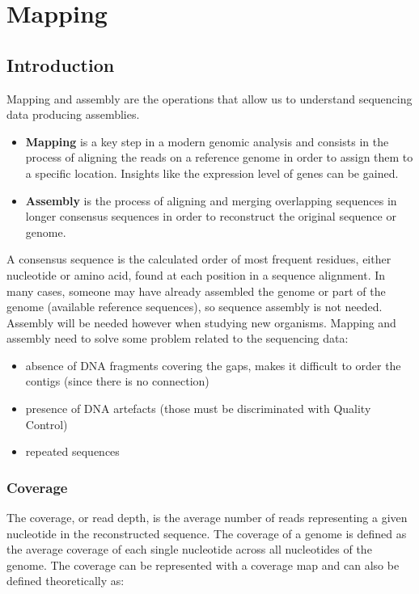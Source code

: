 \graphicspath{{chapters/images/05/}}
\chapter{Mapping}

\section{Introduction}
Mapping and assembly are the operations that allow us to understand sequencing data producing assemblies.

\begin{multicols}{2}
    \begin{itemize}
        \item \textbf{Mapping} is a key step in a modern genomic analysis and consists in the process of aligning the reads on a reference genome in order to assign them to a specific location.
            Insights like the expression level of genes can be gained.
        \item \textbf{Assembly} is the process of aligning and merging overlapping sequences in longer consensus sequences in order to reconstruct the original sequence or genome.
    \end{itemize}
\end{multicols}

A consensus sequence is the calculated order of most frequent residues, either nucleotide or amino acid, found at each position in a sequence alignment.
In many cases, someone may have already assembled the genome or part of the genome (available reference sequences), so sequence assembly is not needed.
Assembly will be needed however when studying new organisms.
Mapping and assembly need to solve some problem related to the sequencing data:

\begin{multicols}{2}
    \begin{itemize}
        \item absence of DNA fragments covering the gaps, makes it difficult to order the contigs (since there is no connection)
        \item presence of DNA artefacts (those must be discriminated with Quality Control)
        \item repeated sequences
    \end{itemize}
\end{multicols}

    \subsection{Coverage}
    The coverage, or read depth, is the average number of reads representing a given nucleotide in the reconstructed sequence.
    The coverage of a genome is defined as the average coverage of each single nucleotide across all nucleotides of the genome.
    The coverage can be represented with a coverage map and can also be defined theoretically as:

